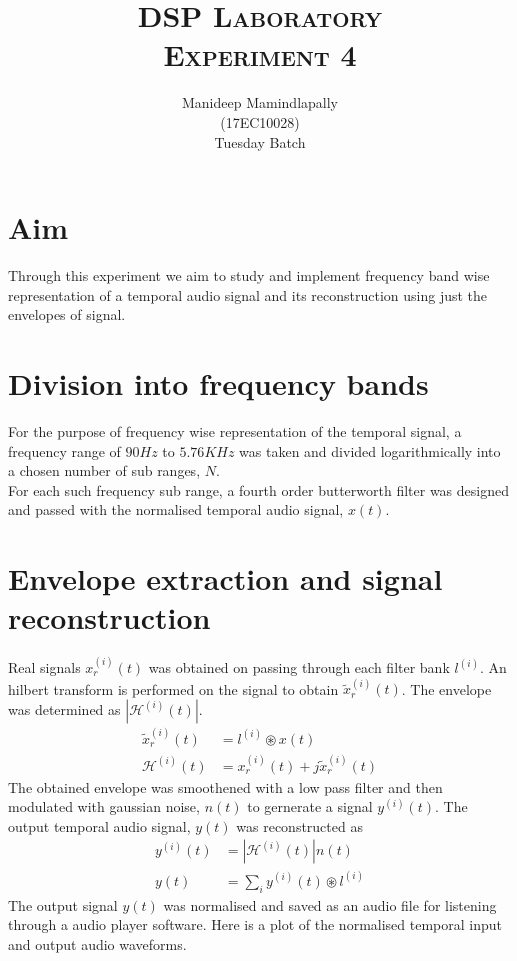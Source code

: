 \documentclass[a4paper,10pt]{article}
\begin{document}
%
   \title{\textsc{DSP Laboratory} \\ \textsc{Experiment 4}}

   \author{ 
   	Manideep Mamindlapally
   	\\ (17EC10028)
   	\\ Tuesday Batch}
          
   \date{}
   
   \maketitle
    
\section*{Aim}
Through this experiment we aim to study and implement frequency band wise representation of a temporal audio signal and its reconstruction using just the envelopes of signal.

\section{Division into frequency bands}
For the purpose of frequency wise representation of the temporal signal, a frequency range of $90 Hz$ to $5.76 KHz$ was taken and divided logarithmically into a chosen number of sub ranges, $N$. 
\\
For each such frequency sub range, a fourth order butterworth filter was designed and passed with the normalised temporal audio signal, $x(t)$.

\section{Envelope extraction and signal reconstruction}
Real signals $x^{(i)}_r(t)$ was obtained on passing through each filter bank $l^{(i)}$. An hilbert transform is performed on the signal to obtain $\tilde{x}^{(i)}_r(t)$. The envelope was determined as $|\mathcal{H}^{(i)}(t)|$.
\begin{align}
\tilde{x}^{(i)}_r(t) &= l^{(i)} \circledast x(t) \nonumber \\
\mathcal{H}^{(i)}(t) &= x^{(i)}_r(t) + j\tilde{x}^{(i)}_r(t)
\end{align}
The obtained envelope was smoothened with a low pass filter and then modulated with gaussian noise, $n(t)$ to gernerate a signal $y^{(i)}(t)$.
The output temporal audio signal, $y(t)$ was reconstructed as
\begin{align}
y^{(i)}(t) &= |\mathcal{H}^{(i)}(t)| n(t) \\
y(t) &= \sum_i y^{(i)}(t) \circledast l^{(i)}
\end{align}
The output signal $y(t)$ was normalised and saved as an audio file for listening through a audio player software. Here is a plot of the normalised temporal input and output audio waveforms.
\end{document}
